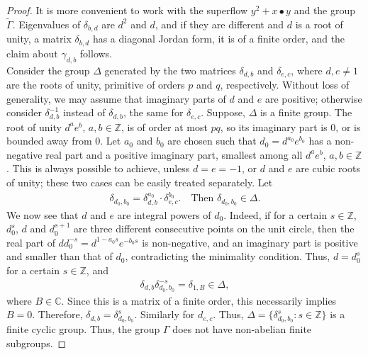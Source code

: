 \documentclass[reqno,12pt]{amsart}
\begin{document}
\begin{proof} It is more convenient to work with the superflow $y^2+x{\bullet} y$ and the group $\widetilde{\Gamma}$. Eigenvalues of $\delta_{b,d}$ are $d^2$ and $d$, and if they are different and $d$ is a root of unity, a matrix $\delta_{b,d}$ has a diagonal Jordan form, it is of a finite order, and the claim about $\gamma_{d,b}$ follows. \\

Consider the group $\Delta$ generated by the two matrices $\delta_{d,b}$ and $\delta_{e,c}$, where $d,e\neq 1$ are the roots of unity, primitive of orders $p$ and $q$, respectively. Without loss of generality, we may assume that imaginary parts of $d$ and $e$ are positive; otherwise consider $\delta^{-1}_{d,b}$ instead of $\delta_{d,b}$, the same for $\delta_{e,c}$. Suppose, $\Delta$ is a finite group. The root of unity $d^{a}e^{b}$, $a,b\in\mathbb{Z}$, is of order at most $pq$, so its imaginary part is $0$, or is bounded away from $0$. Let $a_{0}$ and $b_{0}$ are chosen such that $d_{0}=d^{a_{0}}e^{b_{0}}$ has a non-negative real part and a positive imaginary part, smallest among all $d^{a}e^{b}$, $a,b\in\mathbb{Z}$.
This is always possible to achieve, unless $d=e=-1$, or $d$ and $e$ are cubic roots of unity; these two cases can be easily treated separately.
Let
\begin{eqnarray*}
\delta_{d_{0},b_{0}}=\delta_{d,b}^{a_{0}}\cdot\delta_{e,c}^{b_{0}}.\quad
\text{Then }\delta_{d_{0},b_{0}}\in\Delta.
\end{eqnarray*}
 We now see that $d$ and $e$ are integral powers of $d_{0}$. Indeed, if for a certain $s\in\mathbb{Z}$, $d_{0}^{s}$, $d$ and $d_{0}^{s+1}$ are three different consecutive points on the unit circle, then the real part of $dd_{0}^{-s}=d^{1-a_{0}s}e^{-b_{0}s}$ is non-negative, and an imaginary part is positive and smaller than that of $d_{0}$, contradicting the minimality condition.  
Thus, $d=d_{0}^{s}$ for a certain $s\in\mathbb{Z}$, and
\begin{eqnarray*}
\delta_{d,b}\delta_{d_{0},b_{0}}^{-s}=\delta_{1,B}\in\Delta,
\end{eqnarray*}
where $B\in\mathbb{C}$. Since this is a matrix of a finite order, this necessarily implies $B=0$. Therefore, $\delta_{d,b}=\delta_{d_{0},b_{0}}^{s}$. Similarly  for $d_{e,c}$. Thus, $\Delta=\{\delta_{d_{0},b_{0}}^{s}:s\in\mathbb{Z}\}$ is a finite cyclic group.
Thus, the group $\Gamma$ does not have non-abelian finite subgroups.
\end{proof}
\end{document}

